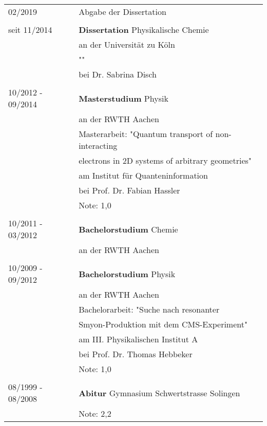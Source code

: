 \documentclass[\main/dresen_thesis.tex]{subfiles}
\begin{document}
	\begin{table}[H]
		\begin{tabular}{p{5cm}l}
			02/2019						& Abgabe der Dissertation\\ \\

			seit 11/2014 			& \textbf{Dissertation} Physikalische Chemie\\
												& an der Universität zu Köln \\
												& ""\\ 
												& bei Dr. Sabrina Disch \\ \\

			10/2012 - 09/2014 & \textbf{Masterstudium} Physik \\
												& an der RWTH Aachen \\
												& Masterarbeit: "Quantum transport of non-interacting\\
												& electrons in 2D systems of arbitrary geometries" \\
												& am Institut f\"ur Quanteninformation\\
												& bei Prof. Dr. Fabian Hassler\\
												& Note: 1,0\\ \\

			10/2011 - 03/2012 & \textbf{Bachelorstudium} Chemie \\
			& an der RWTH Aachen  \\ \\

			10/2009 - 09/2012 & \textbf{Bachelorstudium} Physik \\
											  & an der RWTH Aachen  \\
												& Bachelorarbeit: "Suche nach resonanter \\
												& Smyon-Produktion mit dem CMS-Experiment"\\
												& am III. Physikalischen Institut A\\
												& bei Prof. Dr. Thomas Hebbeker\\
												& Note: 1,0\\ \\


			08/1999 - 08/2008 & \textbf{Abitur} Gymnasium Schwertstrasse Solingen \\
												& Note: 2,2\\
			\end{tabular}
	\end{table}
\end{document}
